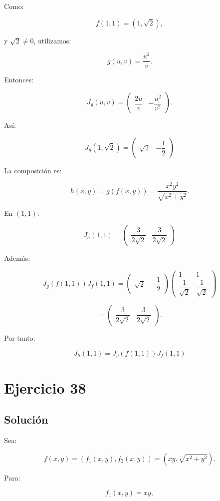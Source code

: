 \documentclass[11pt,a4paper]{article}
\begin{document}
Como:

\[
f(1,1)
=
(1,\sqrt2),
\]

y \(\sqrt2\neq0\), utilizamos:

\[
g(u,v)=\frac{u^2}{v}.
\]

Entonces:

\[
J_g(u,v)
=
\begin{pmatrix}
\dfrac{2u}{v}&-\dfrac{u^2}{v^2}
\end{pmatrix}.
\]

Así:

\[
\boxed{
J_g(1,\sqrt2)
=
\begin{pmatrix}
\sqrt2&-\dfrac12
\end{pmatrix}
}
\]

La composición es:

\[
h(x,y)
=
g(f(x,y))
=
\frac{x^2y^2}{\sqrt{x^2+y^2}}.
\]

En \((1,1)\):

\[
\boxed{
J_h(1,1)
=
\begin{pmatrix}
\dfrac{3}{2\sqrt2}&
\dfrac{3}{2\sqrt2}
\end{pmatrix}
}
\]

Además:

\[
J_g(f(1,1))J_f(1,1)
=
\begin{pmatrix}
\sqrt2&-\dfrac12
\end{pmatrix}
\begin{pmatrix}
1&1\\
\dfrac1{\sqrt2}&\dfrac1{\sqrt2}
\end{pmatrix}
\]

\[
=
\begin{pmatrix}
\dfrac{3}{2\sqrt2}&
\dfrac{3}{2\sqrt2}
\end{pmatrix}.
\]

Por tanto:

\[
\boxed{
J_h(1,1)
=
J_g(f(1,1))J_f(1,1)
}
\]

\section{Ejercicio 38}
\subsection{Solución}

Sea:

\[
f(x,y)
=
(f_1(x,y),f_2(x,y))
=
\left(
xy,
\sqrt{x^2+y^2}
\right).
\]

Para:

\[
f_1(x,y)=xy,
\]
\end{document}

